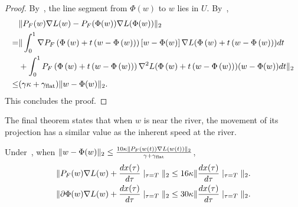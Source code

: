 \begin{proof}

By~, the line segment from $\Phi(w)$ to $w$ lies in $U$. By~,
\begin{align*}
    &\| {P}_F(w) \nabla L(w) - {P}_F(\Phi(w)) \nabla L(\Phi(w)) \|_2 \\
    =& \| \int_{0}^1 \nabla {P}_F\left( \Phi\left(w\right) + t\left(w - \Phi\left(w\right)\right)\right)\left[w - \Phi(w)\right]\nabla L( \Phi\left(w\right) + t\left(w - \Phi\left(w\right)\right)) dt \\
    &+ \int_{0}^1  {P}_F\left( \Phi\left(w\right) + t\left(w - \Phi\left(w\right)\right)\right) \nabla^2 L( \Phi\left(w\right) + t\left(w - \Phi\left(w\right)\right)) (w - \Phi(w)) dt \|_2 \\
    \le& (\gamma \kappa  + \gamma_{\mathrm{flat}}) \| w - \Phi(w)\|_2.
\end{align*}
This concludes the proof.
\end{proof}


The final theorem states that when $w$ is near the river, the movement of its projection has a similar value as the inherent speed at the river.

\begin{lemma}
\label{lem:similarmove}
    Under~, when $\| w- \Phi(w) \|_2 \le \frac{10 \kappa \| {P}_F(w(t)) \nabla L(w(t))\|_2}{\gamma + \gamma_{\mathrm{flat}}}$,
    \begin{align*}
    \|  {P}_F(w) \nabla L(w) +  \frac{d x(\tau)}{d\tau} \mid_{\tau = T} \|_2 &\le 16\kappa \|\frac{d x(\tau)}{d\tau} \mid_{\tau = T}\|_2.\\ 
        \| \partial \Phi(w) \nabla L(w) +  \frac{d x(\tau)}{d\tau} \mid_{\tau = T} \|_2 &\le 30\kappa \|\frac{d x(\tau)}{d\tau} \mid_{\tau = T}\|_2.
    \end{align*}
\end{lemma}

